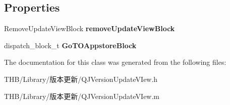 \subsection*{Properties}
\begin{DoxyCompactItemize}
\item 
\mbox{\label{interface_q_j_version_update_v_iew_a6123d1c4a11dfe606c855d6f698eb519}} 
Remove\+Update\+View\+Block {\bfseries remove\+Update\+View\+Block}
\item 
\mbox{\label{interface_q_j_version_update_v_iew_ae4b1815a6cc9f86f3a6aef858aae5669}} 
dispatch\+\_\+block\+\_\+t {\bfseries Go\+T\+O\+Appstore\+Block}
\end{DoxyCompactItemize}


The documentation for this class was generated from the following files\+:\begin{DoxyCompactItemize}
\item 
T\+H\+B/\+Library/版本更新/Q\+J\+Version\+Update\+V\+Iew.\+h\item 
T\+H\+B/\+Library/版本更新/Q\+J\+Version\+Update\+V\+Iew.\+m\end{DoxyCompactItemize}
